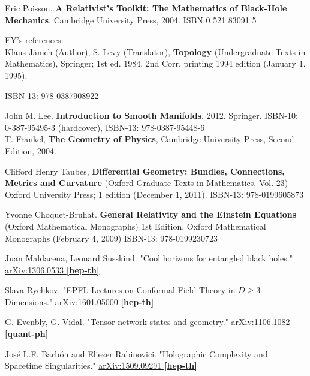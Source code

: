 \documentclass[10pt, twoside]{amsart}
\begin{document}
\begin{thebibliography}{9}
Eric Poisson, 
\textbf{A Relativist's Toolkit: The Mathematics of Black-Hole Mechanics},
Cambridge University Press, 
2004.
ISBN 0 521 83091 5

EY's references: \\

Klaus Jänich (Author), S. Levy (Translator), \textbf{Topology} (Undergraduate Texts in Mathematics), Springer; 1st ed. 1984. 2nd Corr. printing 1994 edition (January 1, 1995).

ISBN-13: 978-0387908922

John M. Lee.  \textbf{Introduction to Smooth Manifolds}.  2012. Springer.   ISBN-10: 0-387-95495-3 (hardcover), ISBN-13: 978-0387-95448-6  \\

T. Frankel,
\textbf{The Geometry of Physics}, 
Cambridge University Press, 
Second Edition,
2004.


Clifford Henry Taubes, \textbf{Differential Geometry: Bundles, Connections, Metrics and Curvature} (Oxford Graduate Texts in Mathematics, Vol. 23) Oxford University Press; 1 edition (December 1, 2011). ISBN-13: 978-0199605873


Yvonne Choquet-Bruhat.  \textbf{General Relativity and the Einstein Equations} (Oxford Mathematical Monographs) 1st Edition.  Oxford Mathematical Monographs (February 4, 2009) ISBN-13: 978-0199230723


Juan Maldacena, Leonard Susskind.  "Cool horizons for entangled black holes."  \href{https://arxiv.org/abs/1306.0533}{ 	arXiv:1306.0533 \textbf{[hep-th]}}

Slava Rychkov.  "EPFL Lectures on Conformal Field Theory in $D \geq 3$ Dimensions."    \href{https://arxiv.org/abs/1601.05000}{arXiv:1601.05000 \textbf{[hep-th]}}

G. Evenbly, G. Vidal.  "Tensor network states and geometry."  \href{https://arxiv.org/abs/1106.1082}{arXiv:1106.1082 \textbf{[quant-ph]}}

Jos\'{e} L.F. Barb\'{o}n and Eliezer Rabinovici.  "Holographic Complexity and Spacetime Singularities."  \href{https://arxiv.org/abs/1509.09291}{arXiv:1509.09291 \textbf{[hep-th]}}

\end{thebibliography}
\end{document}
